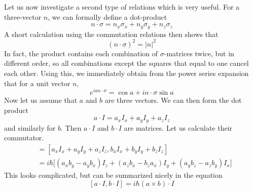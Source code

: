 \documentclass[a4paper, draft]{article}
\theoremstyle{own}
\theoremstyle{remark}
\begin{document}
Let us now investigate a second type of relations which is very useful. For a three-vector $n$, we can formally define a dot-product
$$
n \cdot \sigma = n_x \sigma_x + n_y \sigma_y + n_z \sigma_z
$$
A short calculation using the commutation relations then shows that 
$$
(n \cdot \sigma)^2 = |n|^2
$$
In fact, the product contains each combination of $\sigma$-matrices twice, but in different order, so all combinations except the squares that equal to one cancel each other. Using this, we immediately obtain from the power series expansion that for a unit vector $n$, 
$$
e^{ia n \cdot \sigma} = \cos a + i n \cdot \sigma \sin a 
$$
Now let us assume that $a$ and $b$ are three vectors. We can then form the dot product
$$
a \cdot I = a_x I_x + a_y I_y + a_z I_z
$$
and similarly for $b$. Then $a \cdot I$ and $b \cdot I$ are matrices. Let us calculate their commutator.
\begin{align*}
[a \cdot I, b \cdot I ] &= [a_x I_x + a_y I_y + a_z I_z, b_x I_x + b_y I_y + b_z I_z] \\
&= i \hbar \big[ 
 (a_x b_y - a_y b_x) I_z + (a_z b_x - b_z a_x) I_y + (a_y b_z - a_z b_y) I_x
\big] 
\end{align*}
This looks complicated, but can be summarized nicely in the equation
$$
[a \cdot I, b \cdot I ] = i \hbar (a \times b) \cdot I
$$
\end{document}
